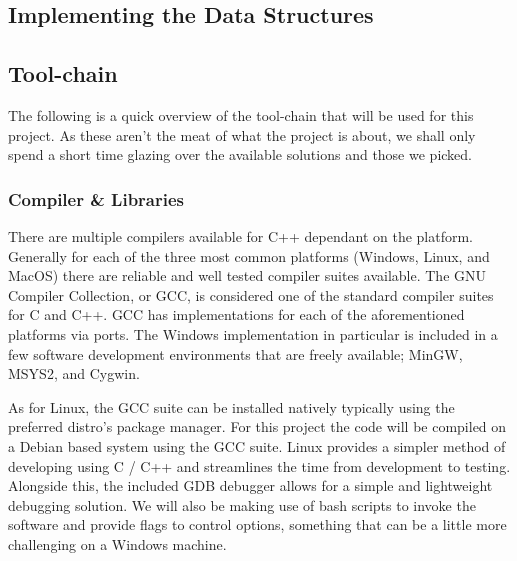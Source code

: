 \documentclass{article}
\begin{document}

\subsection{Implementing the Data Structures}

\subsection{Tool-chain}
The following is a quick overview of the tool-chain that will be used for this project. As these aren't the meat of what the project is about, we shall only spend a short time glazing over the available solutions and those we picked.

\subsubsection{Compiler \& Libraries}
There are multiple compilers available for C++ dependant on the platform. Generally for each of the three most common platforms (Windows, Linux, and MacOS) there are reliable and well tested compiler suites available. The GNU Compiler Collection, or GCC, is considered one of the standard compiler suites for C and C++. GCC has implementations for each of the aforementioned platforms via ports. The Windows implementation in particular is included in a few software development environments that are freely available; MinGW, MSYS2, and Cygwin.

As for Linux, the GCC suite can be installed natively typically using the preferred distro's package manager. For this project the code will be compiled on a Debian based system using the GCC suite. Linux provides a simpler method of developing using C / C++ and streamlines the time from development to testing. Alongside this, the included GDB debugger allows for a simple and lightweight debugging solution. We will also be making use of bash scripts to invoke the software and provide flags to control options, something that can be a little more challenging on a Windows machine.
\end{document}
